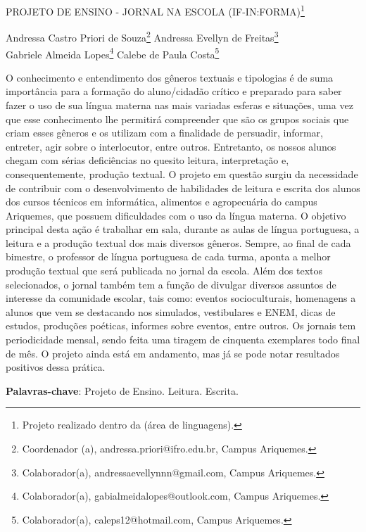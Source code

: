 \documentclass[article,12pt,onesidea,4paper,english,brazil]{abntex2}
\begin{document}
	
	
	\frenchspacing 
	
	\begin{center}
		\LARGE PROJETO DE ENSINO - JORNAL NA ESCOLA (IF-IN:FORMA)\footnote{Projeto realizado dentro da (área de linguagens).}
		
		\normalsize
		Andressa Castro Priori de Souza\footnote{Coordenador (a), andressa.priori@ifro.edu.br, Campus Ariquemes.} 
	Andressa Evellyn de Freitas\footnote{Colaborador(a), andressaevellynnn@gmail.com, Campus Ariquemes.}\\ 
	Gabriele Almeida Lopes\footnote{Colaborador(a), gabialmeidalopes@outlook.com, Campus Ariquemes.} 
	Calebe de Paula Costa\footnote{Colaborador(a), caleps12@hotmail.com, Campus Ariquemes.} 
	\end{center}
	
	\noindent O conhecimento e entendimento dos gêneros textuais e tipologias é de suma
	importância para a formação do aluno/cidadão crítico e preparado para saber fazer o
	uso de sua língua materna nas mais variadas esferas e situações, uma vez que esse
	conhecimento lhe permitirá compreender que são os grupos sociais que criam esses
	gêneros e os utilizam com a finalidade de persuadir, informar, entreter, agir sobre o
	interlocutor, entre outros. Entretanto, os nossos alunos chegam com sérias
	deficiências no quesito leitura, interpretação e, consequentemente, produção textual.
	O projeto em questão surgiu da necessidade de contribuir com o desenvolvimento
	de habilidades de leitura e escrita dos alunos dos cursos técnicos em informática,
	alimentos e agropecuária do campus Ariquemes, que possuem dificuldades com o
	uso da língua materna. O objetivo principal desta ação é trabalhar em sala, durante
	as aulas de língua portuguesa, a leitura e a produção textual dos mais diversos
	gêneros. Sempre, ao final de cada bimestre, o professor de língua portuguesa de
	cada turma, aponta a melhor produção textual que será publicada no jornal da
	escola. Além dos textos selecionados, o jornal também tem a função de divulgar
	diversos assuntos de interesse da comunidade escolar, tais como: eventos
	socioculturais, homenagens a alunos que vem se destacando nos simulados,
	vestibulares e ENEM, dicas de estudos, produções poéticas, informes sobre
	eventos, entre outros. Os jornais tem periodicidade mensal, sendo feita uma tiragem
	de cinquenta exemplares todo final de mês. O projeto ainda está em andamento,
	mas já se pode notar resultados positivos dessa prática.
	
	\vspace{\onelineskip}
	
	\noindent
	\textbf{Palavras-chave}: Projeto de Ensino. Leitura. Escrita.
	
\end{document}
